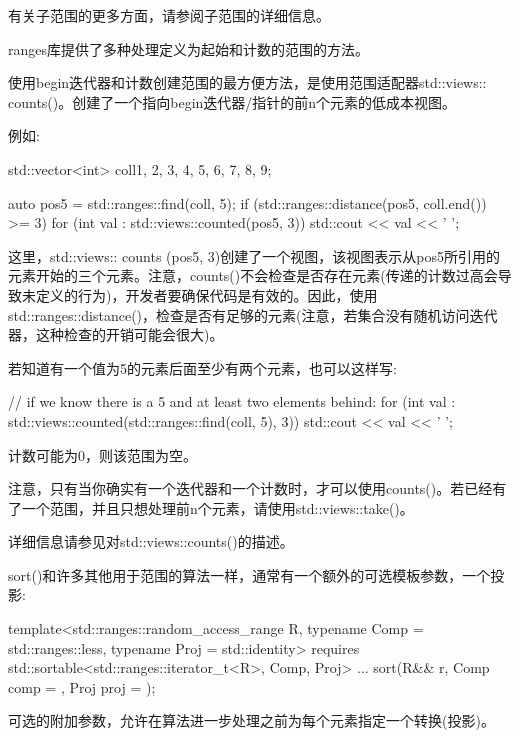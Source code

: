 有关子范围的更多方面，请参阅子范围的详细信息。


ranges库提供了多种处理定义为起始和计数的范围的方法。

使用begin迭代器和计数创建范围的最方便方法，是使用范围适配器std::views:: counts()。创建了一个指向begin迭代器/指针的前n个元素的低成本视图。

例如:

\begin{cpp}
std::vector<int> coll{1, 2, 3, 4, 5, 6, 7, 8, 9};

auto pos5 = std::ranges::find(coll, 5);
if (std::ranges::distance(pos5, coll.end()) >= 3) {
	for (int val : std::views::counted(pos5, 3)) {
		std::cout << val << ' ';
	}
}
\end{cpp}

这里，std::views:: counts (pos5, 3)创建了一个视图，该视图表示从pos5所引用的元素开始的三个元素。注意，counts()不会检查是否存在元素(传递的计数过高会导致未定义的行为)，开发者要确保代码是有效的。因此，使用std::ranges::distance()，检查是否有足够的元素(注意，若集合没有随机访问迭代器，这种检查的开销可能会很大)。

若知道有一个值为5的元素后面至少有两个元素，也可以这样写:

\begin{cpp}
// if we know there is a 5 and at least two elements behind:
for (int val : std::views::counted(std::ranges::find(coll, 5), 3)) {
	std::cout << val << ' ';
}
\end{cpp}

计数可能为0，则该范围为空。

注意，只有当你确实有一个迭代器和一个计数时，才可以使用counts()。若已经有了一个范围，并且只想处理前n个元素，请使用std::views::take()。

详细信息请参见对std::views::counts()的描述。


sort()和许多其他用于范围的算法一样，通常有一个额外的可选模板参数，一个投影:

\begin{cpp}
template<std::ranges::random_access_range R,
			typename Comp = std::ranges::less,
			typename Proj = std::identity>
requires std::sortable<std::ranges::iterator_t<R>, Comp, Proj>
... sort(R&& r, Comp comp = {}, Proj proj = {});
\end{cpp}

可选的附加参数，允许在算法进一步处理之前为每个元素指定一个转换(投影)。

